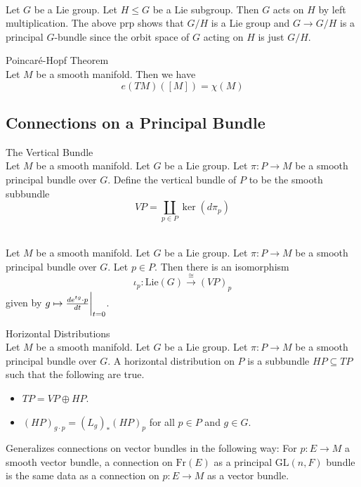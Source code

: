 \documentclass[a4paper]{article}
\begin{document}
\begin{eg}{}{}\\
Let $G$ be a Lie group. Let $H\leq G$ be a Lie subgroup. Then $G$ acts on $H$ by left multiplication. The above prp shows that $G/H$ is a Lie group and $G\to G/H$ is a principal $G$-bundle since the orbit space of $G$ acting on $H$ is just $G/H$. 
\end{eg}

\begin{thm}{Poincaré-Hopf Theorem}{}\\
Let $M$ be a smooth manifold. Then we have $$e(TM)([M])=\chi(M)$$
\end{thm}

\subsection{Connections on a Principal Bundle}
\begin{defn}{The Vertical Bundle}{}\\
Let $M$ be a smooth manifold. Let $G$ be a Lie group. Let $\pi:P\to M$ be a smooth principal bundle over $G$. Define the vertical bundle of $P$ to be the smooth subbundle $$VP=\coprod_{p\in P}\ker(d\pi_p)$$
\end{defn}

\begin{lmm}{}{}\\
Let $M$ be a smooth manifold. Let $G$ be a Lie group. Let $\pi:P\to M$ be a smooth principal bundle over $G$. Let $p\in P$. Then there is an isomorphism $$\iota_p:\text{Lie}(G)\overset{\cong}{\to}(VP)_p$$ given by $g\mapsto\frac{d e^{tg}\cdot p}{dt}\bigg{|}_{t=0}$. 
\end{lmm}

\begin{defn}{Horizontal Distributions}{}\\
Let $M$ be a smooth manifold. Let $G$ be a Lie group. Let $\pi:P\to M$ be a smooth principal bundle over $G$. A horizontal distribution on $P$ is a subbundle $HP\subseteq TP$ such that the following are true. 
\begin{itemize}
\item $TP=VP\oplus HP$. 
\item $(HP)_{g\cdot p}=(L_g)_\ast(HP)_p$ for all $p\in P$ and $g\in G$. 
\end{itemize}
\end{defn}

Generalizes connections on vector bundles in the following way: For $p:E\to M$ a smooth vector bundle, a connection on $\text{Fr}(E)$ as a principal $\text{GL}(n,F)$ bundle is the same data as a connection on $p:E\to M$ as a vector bundle. 
\end{document}
